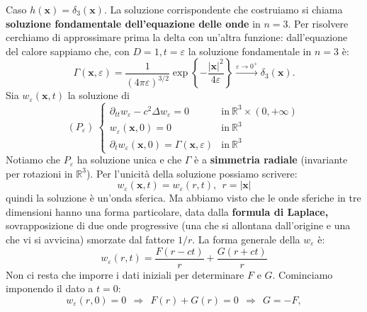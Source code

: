 \documentclass[10pt,a4paper,twoside,openright]{book}
\newcommand{\x}{\mathbf{x}}
\begin{document}
Caso $\displaystyle h(\x) =\delta _{3}(\x)$. La soluzione corrispondente che costruiamo si chiama \textbf{soluzione fondamentale dell'equazione delle onde} in $\displaystyle n=3$. Per risolvere cerchiamo di approssimare prima la delta con un'altra funzione: dall'equazione del calore sappiamo che, con $\displaystyle D=1,t=\varepsilon $ la soluzione fondamentale in $\displaystyle n=3$ è:
\begin{equation*}
	\Gamma (\x ,\varepsilon ) =\frac{1}{( 4\pi \varepsilon )^{3/2}}\exp\left\{-\frac{| \x| ^{2}}{4\varepsilon }\right\}\xrightarrow{\varepsilon \rightarrow 0^{+}} \delta _{3}(\x) .
\end{equation*}
Sia $\displaystyle w_{\varepsilon }(\x ,t)$ la soluzione di
\begin{equation*}
	( P_{\varepsilon }) \ 
	\begin{cases}
		\partial _{tt} w_{\varepsilon } -c^{2} \Delta w_{\varepsilon } =0                & \text{in} \ \mathbb{R}^{3} \times ( 0,+\infty ) \\
		w_{\varepsilon }(\x ,0) =0                                               & \text{in} \ \mathbb{R}^{3}                      \\
		\partial _{t} w_{\varepsilon }(\x ,0) =\Gamma (\x ,\varepsilon ) & \text{in} \ \mathbb{R}^{3}                      
	\end{cases}
\end{equation*}
Notiamo che $\displaystyle P_{\varepsilon }$ ha soluzione unica e che $\displaystyle \Gamma $ è a \textbf{simmetria radiale} (invariante per rotazioni in $\displaystyle \mathbb{R}^{3}$). Per l'unicità della soluzione possiamo scrivere:
\begin{equation*}
	w_{\varepsilon }(\x ,t) =w_{\varepsilon }( r,t) ,\ \ r=| \x| 
\end{equation*}
quindi la soluzione è un'onda sferica. Ma abbiamo visto che le onde sferiche in tre dimensioni hanno una forma particolare, data dalla \textbf{formula di Laplace, }sovrapposizione di due onde progressive (una che si allontana dall'origine e una che vi si avvicina) smorzate dal fattore $\displaystyle 1/r$. La forma generale della $\displaystyle w_{\varepsilon }$ è:
\begin{equation*}
	w_{\varepsilon }( r,t) =\frac{F( r-ct)}{r} +\frac{G( r+ct)}{r}
\end{equation*}
Non ci resta che imporre i dati iniziali per determinare $\displaystyle F$ e $\displaystyle G$. Cominciamo imponendo il dato a $\displaystyle t=0$:
\begin{equation*}
	w_{\varepsilon }( r,0) =0\ \ \Rightarrow \ \ F( r) +G( r) =0\ \ \Rightarrow \ \ G=-F,
\end{equation*}
\end{document}

